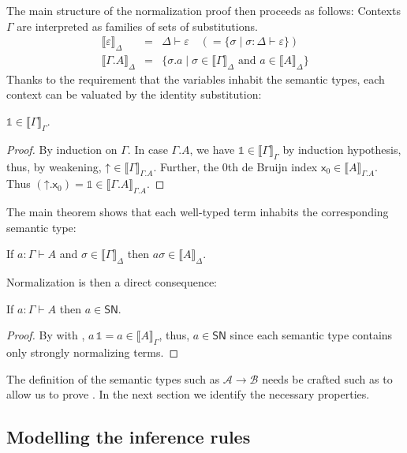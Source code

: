 \documentclass[a4paper,USenglish,cleveref, autoref, thm-restate]{lipics-v2019}
\newcommand{\den}[2][]{\llbracket#2\rrbracket^{#1}}
\newcommand{\sid}{\mathds{1}}
\newcommand{\Den}[2]{\den{#1}_{#2}}
\newcommand{\Ge}{\ensuremath{\varepsilon}}
\newcommand{\Gs}{\ensuremath{\sigma}}
\newcommand{\x}{\mathsf{x}}
\newcommand{\A}{\mathcal{A}}
\newcommand{\B}{\mathcal{B}}
\newcommand{\SN}{\mathsf{SN}}
\newcommand{\up}{\mathord{\uparrow}}
\begin{document}
The main structure of the normalization proof then proceeds as follows:
Contexts $\Gamma$ are interpreted as families of sets of
substitutions.
\[
  \begin{array}{lll}
\Den \Ge \Delta & = & \Delta \vdash \Ge
\quad ( {} = \{ \sigma \mid \sigma : \Delta \vdash \Ge \})\\
\Den{\Gamma.A} \Delta & = & \{ \Gs.a \mid \Gs \in \Den \Gamma \Delta
                            \mbox{ and } a \in \Den A \Delta \}
  \end{array}
\]
Thanks to the requirement that the variables inhabit the semantic
types, each context can be valuated by the identity substitution:
\begin{lemma}
  \label{lem:id}
  $\sid \in \Den \Gamma \Gamma$.
\end{lemma}
\begin{proof}
  By induction on $\Gamma$.  In case $\Gamma.A$, we have
  $\sid \in \Den \Gamma \Gamma$ by induction hypothesis, thus, by
  weakening, ${\up} \in \Den\Gamma{\Gamma.A}$.  Further, the 0th de
  Bruijn index $\x_0 \in \Den A {\Gamma.A}$.
  Thus $(\up.\x_0) = \sid \in \Den{\Gamma.A}{\Gamma.A}$.
\end{proof}

The main theorem shows that each well-typed term inhabits the corresponding semantic type:
\begin{theorem}
  \label{thm:fund}
  If $a : \Gamma \vdash A$ and $\Gs \in \Den \Gamma \Delta$ then $a
  \sigma \in \Den A \Delta$.
\end{theorem}
Normalization is then a direct consequence:
\begin{corollary}
  If $a : \Gamma \vdash A$ then $a \in \SN$.
\end{corollary}
\begin{proof}
  By  with , $a\, \sid = a \in \Den A
  \Gamma$, thus, $a \in \SN$ since each semantic type contains only
  strongly normalizing terms.
\end{proof}

The definition of the semantic types such as $\A \to \B$ needs be
crafted such as to allow us to prove .
In the next section we identify the necessary properties.

\subsection{Modelling the inference rules}
\end{document}
